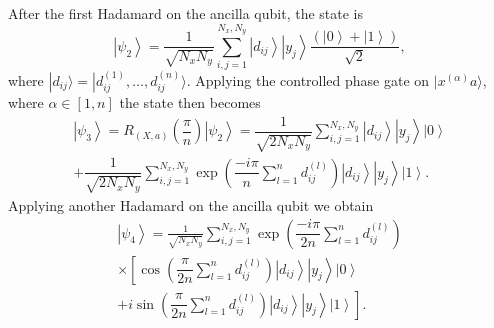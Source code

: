 \documentclass[pra,showkeys,twocolumn,showpacs,aps,10pt]{revtex4-2}
\begin{document}
After the first Hadamard on the ancilla qubit, the state is
%
\begin{equation}
    \left| \psi_2 \right\rangle =
    \frac{1}{\sqrt{N_x N_y}}\sum\limits_{i, j=1}^{N_x,N_y}
    \left| d_{ij} \right\rangle
    \left| y_j \right\rangle
    \dfrac{(\left| 0 \right\rangle + \left| 1 \right\rangle)}{\sqrt{2}},
\end{equation}
%
where $| d_{ij} \rangle = | d_{ij}^{(1)},\ldots,d_{ij}^{(n)} \rangle$.
Applying the controlled phase gate on $| x^{(\alpha)} a \rangle$, where $\alpha \in  [1,n]$  the state then becomes
%
\begin{multline}
    \left| \psi_3 \right\rangle = R_{(X,a)}\left(\dfrac{\pi}{n}\right)\left| \psi_2 \right\rangle
     = \dfrac{1}{\sqrt{2 N_x N_y}}
        \sum\limits_{i, j=1}^{N_x,N_y}
        \left| d_{ij} \right\rangle
        \left| y_j \right\rangle
        \left| 0 \right\rangle
        \\ + \dfrac{1}{\sqrt{2 N_x N_y}}
        \sum\limits_{i, j=1}^{N_x,N_y}
        \exp\left(\dfrac{-i \pi}{n}\sum\limits_{l=1}^n d^{(l)}_{ij} \right)
        \left| d_{ij} \right\rangle
        \left| y_j \right\rangle
        \left| 1 \right\rangle .
\end{multline}
%
Applying another Hadamard on the ancilla qubit we obtain
%
\begin{multline}
    \left| \psi_4 \right\rangle =
    \frac{1}{\sqrt{N_x N_y}}\sum\limits_{i, j=1}^{N_x,N_y}
    \exp \left(\dfrac{-i \pi}{2n}\sum\limits_{l=1}^n d^{(l)}_{ij} \right)
    \\ \times
        \left[ \cos\left(\dfrac{\pi}{2n}\sum\limits_{l=1}^n d^{(l)}_{ij} \right)
        \left| d_{ij} \right\rangle
        \left| y_j \right\rangle
        \left| 0 \right\rangle\right.
        \\+
        \left. i \sin\left(\dfrac{\pi}{2n}\sum\limits_{l=1}^n d^{(l)}_{ij} \right)
        \left| d_{ij} \right\rangle
        \left| y_j \right\rangle
        \left| 1 \right\rangle\right] .
\end{multline}
%
\end{document}
